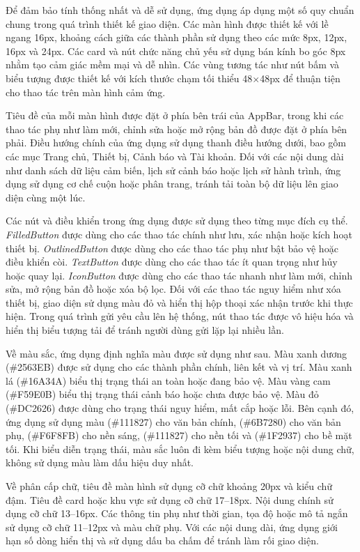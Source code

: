 \documentclass[../DoAn.tex]{subfiles}
\begin{document}
Để đảm bảo tính thống nhất và dễ sử dụng, ứng dụng áp dụng một số quy chuẩn chung trong quá trình thiết kế giao diện. Các màn hình được thiết kế với lề ngang 16px, khoảng cách giữa các thành phần sử dụng theo các mức 8px, 12px, 16px và 24px. Các card và nút chức năng chủ yếu sử dụng bán kính bo góc 8px nhằm tạo cảm giác mềm mại và dễ nhìn. Các vùng tương tác như nút bấm và biểu tượng được thiết kế với kích thước chạm tối thiểu 48$\times$48px để thuận tiện cho thao tác trên màn hình cảm ứng.

Tiêu đề của mỗi màn hình được đặt ở phía bên trái của AppBar, trong khi các thao tác phụ như làm mới, chỉnh sửa hoặc mở rộng bản đồ được đặt ở phía bên phải. Điều hướng chính của ứng dụng sử dụng thanh điều hướng dưới, bao gồm các mục Trang chủ, Thiết bị, Cảnh báo và Tài khoản. Đối với các nội dung dài như danh sách dữ liệu cảm biến, lịch sử cảnh báo hoặc lịch sử hành trình, ứng dụng sử dụng cơ chế cuộn hoặc phân trang, tránh tải toàn bộ dữ liệu lên giao diện cùng một lúc.

Các nút và điều khiển trong ứng dụng được sử dụng theo từng mục đích cụ thể. \textit{FilledButton} được dùng cho các thao tác chính như lưu, xác nhận hoặc kích hoạt thiết bị. \textit{OutlinedButton} được dùng cho các thao tác phụ như bật bảo vệ hoặc điều khiển còi. \textit{TextButton} được dùng cho các thao tác ít quan trọng như hủy hoặc quay lại. \textit{IconButton} được dùng cho các thao tác nhanh như làm mới, chỉnh sửa, mở rộng bản đồ hoặc xóa bộ lọc. Đối với các thao tác nguy hiểm như xóa thiết bị, giao diện sử dụng màu đỏ và hiển thị hộp thoại xác nhận trước khi thực hiện. Trong quá trình gửi yêu cầu lên hệ thống, nút thao tác được vô hiệu hóa và hiển thị biểu tượng tải để tránh người dùng gửi lặp lại nhiều lần.

Về màu sắc, ứng dụng định nghĩa màu được sử dụng như sau. Màu xanh dương (\#2563EB) được sử dụng cho các thành phần chính, liên kết và vị trí. Màu xanh lá (\#16A34A) biểu thị trạng thái an toàn hoặc đang bảo vệ. Màu vàng cam (\#F59E0B) biểu thị trạng thái cảnh báo hoặc chưa được bảo vệ. Màu đỏ (\#DC2626) được dùng cho trạng thái nguy hiểm, mất cắp hoặc lỗi. Bên cạnh đó, ứng dụng sử dụng màu (\#111827) cho văn bản chính, (\#6B7280) cho văn bản phụ, (\#F6F8FB) cho nền sáng, (\#111827) cho nền tối và (\#1F2937) cho bề mặt tối. Khi biểu diễn trạng thái, màu sắc luôn đi kèm biểu tượng hoặc nội dung chữ, không sử dụng màu làm dấu hiệu duy nhất.

Về phân cấp chữ, tiêu đề màn hình sử dụng cỡ chữ khoảng 20px và kiểu chữ đậm. Tiêu đề card hoặc khu vực sử dụng cỡ chữ 17--18px. Nội dung chính sử dụng cỡ chữ 13--16px. Các thông tin phụ như thời gian, tọa độ hoặc mô tả ngắn sử dụng cỡ chữ 11--12px và màu chữ phụ. Với các nội dung dài, ứng dụng giới hạn số dòng hiển thị và sử dụng dấu ba chấm để tránh làm rối giao diện.
\end{document}
